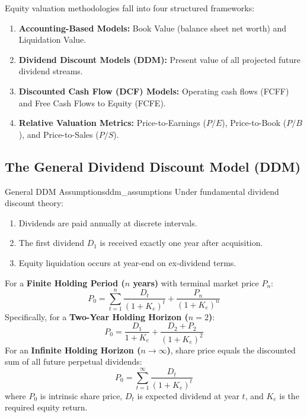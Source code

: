 \begin{formulabox}
Equity valuation methodologies fall into four structured frameworks:
\begin{enumerate}[noitemsep, leftmargin=*]
    \item \textbf{Accounting-Based Models:} Book Value (balance sheet net worth) and Liquidation Value.
    \item \textbf{Dividend Discount Models (DDM):} Present value of all projected future dividend streams.
    \item \textbf{Discounted Cash Flow (DCF) Models:} Operating cash flows (FCFF) and Free Cash Flows to Equity (FCFE).
    \item \textbf{Relative Valuation Metrics:} Price-to-Earnings ($P/E$), Price-to-Book ($P/B$), and Price-to-Sales ($P/S$).
\end{enumerate}
\end{formulabox}

\subsection{The General Dividend Discount Model (DDM)}

\begin{definition}{General DDM Assumptions}{ddm_assumptions}
Under fundamental dividend discount theory:
\begin{enumerate}[noitemsep, leftmargin=*]
    \item Dividends are paid annually at discrete intervals.
    \item The first dividend $D_1$ is received exactly one year after acquisition.
    \item Equity liquidation occurs at year-end on ex-dividend terms.
\end{enumerate}
\end{definition}

\begin{formulabox}
For a \textbf{Finite Holding Period ($n$ years)} with terminal market price $P_n$:
\begin{equation}
    P_0 = \sum_{t=1}^{n} \frac{D_t}{(1 + K_e)^t} + \frac{P_n}{(1 + K_e)^n}
\end{equation}
Specifically, for a \textbf{Two-Year Holding Horizon ($n = 2$)}:
\begin{equation}
    P_0 = \frac{D_1}{1 + K_e} + \frac{D_2 + P_2}{(1 + K_e)^2}
\end{equation}
For an \textbf{Infinite Holding Horizon ($n \to \infty$)}, share price equals the discounted sum of all future perpetual dividends:
\begin{equation}
    P_0 = \sum_{t=1}^{\infty} \frac{D_t}{(1 + K_e)^t}
\end{equation}
where $P_0$ is intrinsic share price, $D_t$ is expected dividend at year $t$, and $K_e$ is the required equity return.
\end{formulabox}

